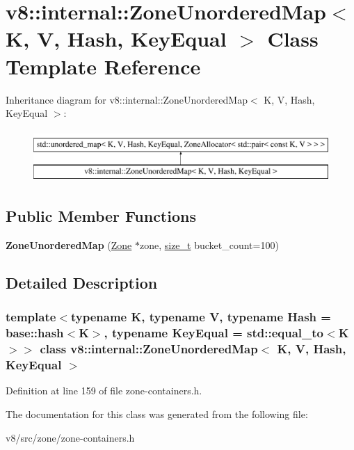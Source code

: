 \hypertarget{classv8_1_1internal_1_1ZoneUnorderedMap}{}\section{v8\+:\+:internal\+:\+:Zone\+Unordered\+Map$<$ K, V, Hash, Key\+Equal $>$ Class Template Reference}
\label{classv8_1_1internal_1_1ZoneUnorderedMap}
Inheritance diagram for v8\+:\+:internal\+:\+:Zone\+Unordered\+Map$<$ K, V, Hash, Key\+Equal $>$\+:\begin{figure}[H]
\begin{center}
\leavevmode
\includegraphics[height=2.000000cm]{classv8_1_1internal_1_1ZoneUnorderedMap}
\end{center}
\end{figure}
\subsection*{Public Member Functions}
\begin{DoxyCompactItemize}
\item 
\mbox{\label{classv8_1_1internal_1_1ZoneUnorderedMap_a954ffe0db2e9ec84479ff415598f2952}} 
{\bfseries Zone\+Unordered\+Map} (\mbox{\hyperlink{classv8_1_1internal_1_1Zone}{Zone}} $\ast$zone, \mbox{\hyperlink{classsize__t}{size\+\_\+t}} bucket\+\_\+count=100)
\end{DoxyCompactItemize}


\subsection{Detailed Description}
\subsubsection*{template$<$typename K, typename V, typename Hash = base\+::hash$<$\+K$>$, typename Key\+Equal = std\+::equal\+\_\+to$<$\+K$>$$>$\newline
class v8\+::internal\+::\+Zone\+Unordered\+Map$<$ K, V, Hash, Key\+Equal $>$}



Definition at line 159 of file zone-\/containers.\+h.



The documentation for this class was generated from the following file\+:\begin{DoxyCompactItemize}
\item 
v8/src/zone/zone-\/containers.\+h\end{DoxyCompactItemize}
